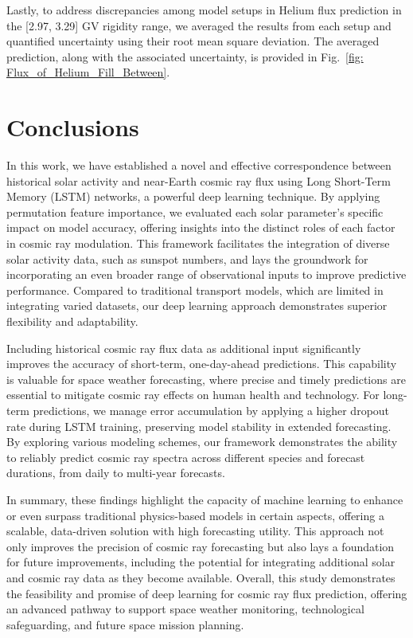 \documentclass[twocolumn,,12pt]{aastex631}
\begin{document}
Lastly, to address discrepancies among model setups in Helium flux prediction in the [2.97, 3.29] GV rigidity range, we averaged the results from each setup and quantified uncertainty using their root mean square deviation. The averaged prediction, along with the associated uncertainty, is provided in Fig.~\ref{fig: Flux_of_Helium_Fill_Between}.

\section{Conclusions} 
\label{sec: Conclusions}
In this work, we have established a novel and effective correspondence between historical solar activity and near-Earth cosmic ray flux using Long Short-Term Memory (LSTM) networks, a powerful deep learning technique. By applying permutation feature importance, we evaluated each solar parameter’s specific impact on model accuracy, offering insights into the distinct roles of each factor in cosmic ray modulation. This framework facilitates the integration of diverse solar activity data, such as sunspot numbers, and lays the groundwork for incorporating an even broader range of observational inputs to improve predictive performance. Compared to traditional transport models, which are limited in integrating varied datasets, our deep learning approach demonstrates superior flexibility and adaptability.

Including historical cosmic ray flux data as additional input significantly improves the accuracy of short-term, one-day-ahead predictions. This capability is valuable for space weather forecasting, where precise and timely predictions are essential to mitigate cosmic ray effects on human health and technology. For long-term predictions, we manage error accumulation by applying a higher dropout rate during LSTM training, preserving model stability in extended forecasting. By exploring various modeling schemes, our framework demonstrates the ability to reliably predict cosmic ray spectra across different species and forecast durations, from daily to multi-year forecasts. 

In summary, these findings highlight the capacity of machine learning to enhance or even surpass traditional physics-based models in certain aspects, offering a scalable, data-driven solution with high forecasting utility. This approach not only improves the precision of cosmic ray forecasting but also lays a foundation for future improvements, including the potential for integrating additional solar and cosmic ray data as they become available. Overall, this study demonstrates the feasibility and promise of deep learning for cosmic ray flux prediction, offering an advanced pathway to support space weather monitoring, technological safeguarding, and future space mission planning.
\end{document}
